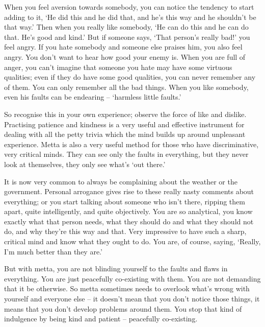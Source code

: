 When you feel aversion towards somebody, you can notice the tendency to start adding to it, `He did this and he did that, and he's this way and he shouldn't be that way.' Then when you really like somebody, `He can do this and he can do that. He's good and kind.' But if someone says, `That person's really bad!' you feel angry. If you hate somebody and someone else praises him, you also feel angry. You don't want to hear how good your enemy is. When you are full of anger, you can't imagine that someone you hate may have some virtuous qualities; even if they do have some good qualities, you can never remember any of them. You can only remember all the bad things. When you like somebody, even his faults can be endearing -- `harmless little faults.'

So recognise this in your own experience; observe the force of like and dislike. Practising patience and kindness is a very useful and effective instrument for dealing with all the petty trivia which the mind builds up around unpleasant experience. Metta is also a very useful method for those who have discriminative, very critical minds. They can see only the faults in everything, but they never look at themselves, they only see what's `out there.'

It is now very common to always be complaining about the weather or the government. Personal arrogance gives rise to these really nasty comments about everything; or you start talking about someone who isn't there, ripping them apart, quite intelligently, and quite objectively. You are so analytical, you know exactly what that person needs, what they should do and what they should not do, and why they're this way and that. Very impressive to have such a sharp, critical mind and know what they ought to do. You are, of course, saying, `Really, I'm much better than they are.'

But with metta, you are not blinding yourself to the faults and flaws in everything. You are just peacefully co-existing with them. You are not demanding that it be otherwise. So metta sometimes needs to overlook what's wrong with yourself and everyone else -- it doesn't mean that you don't notice those things, it means that you don't develop problems around them. You stop that kind of indulgence by being kind and patient -- peacefully co-existing.

